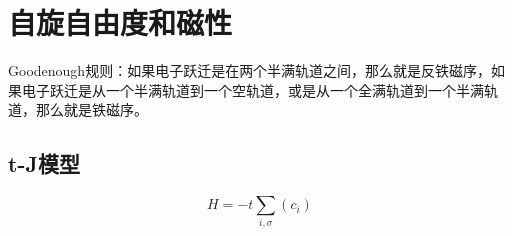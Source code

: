 \chapter{自旋自由度和磁性}

Goodenough规则：如果电子跃迁是在两个半满轨道之间，那么就是反铁磁序，如果电子跃迁是从一个半满轨道到一个空轨道，或是从一个全满轨道到一个半满轨道，那么就是铁磁序。

\section{t-J模型}

\begin{equation}
    H = - t \sum_{i, \sigma} (c_i)
\end{equation}